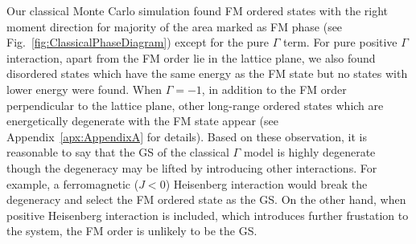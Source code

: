 \documentclass[aps,prb,reprint,amsfonts,amsmath,amssymb,showpacs,groupedaddress,superscriptaddress]{revtex4-1}
\begin{document}
Our classical Monte Carlo simulation found FM ordered states with the right moment direction for majority of the area marked as FM phase (see Fig.~\ref{fig:ClassicalPhaseDiagram}) except for the pure $\Gamma$ term. For pure positive $\Gamma$ interaction, apart from the FM order lie in the lattice plane, we also found disordered states which have the same energy as the FM state but no states with lower energy were found. When $\Gamma=-1$, in addition to the FM order perpendicular to the lattice plane, other long-range ordered states which are energetically degenerate with the FM state appear (see Appendix~\ref{apx:AppendixA} for details). Based on these observation, it is reasonable to say that the GS of the classical $\Gamma$ model is highly degenerate though the degeneracy may be lifted by introducing other interactions. For example, a ferromagnetic ($J<0$) Heisenberg interaction would break the degeneracy and select the FM ordered state as the GS. On the other hand, when positive Heisenberg interaction is included, which introduces further frustation to the system, the FM order is unlikely to be the GS.
\end{document}
